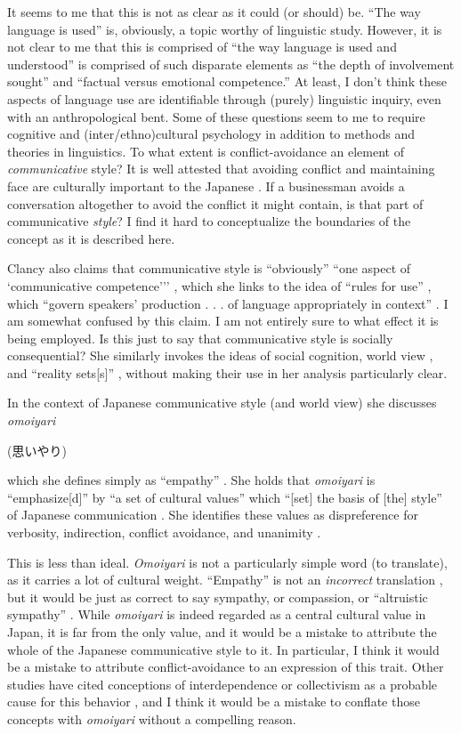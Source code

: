 \documentclass[man,12pt,natbib]{apa6}
\begin{document}
It seems to me that this is not as clear as it could (or should) be.  ``The way
language is used'' is, obviously, a topic worthy of linguistic study. However,
it is not clear to me that this is comprised of ``the way language is used and
understood'' is comprised of such disparate elements as ``the depth of
involvement sought'' and ``factual versus emotional competence.'' At least, I
don't think these aspects of language use are identifiable through (purely)
linguistic inquiry, even with an anthropological bent. Some of these questions
seem to me to require cognitive and (inter/ethno)cultural psychology in
addition to methods and theories in linguistics. To what extent is
conflict-avoidance an element of \emph{communicative} style? It is well
attested that avoiding conflict and maintaining face are culturally important
to the Japanese \citep{Benedict46,Ohbuchi94}. If a businessman avoids a
conversation altogether to avoid the conflict it might contain, is that part of
communicative \emph{style}? I find it hard to conceptualize the boundaries of
the concept as it is described here.

Clancy also claims that communicative style is ``obviously'' ``one aspect of
`communicative competence''\thinspace ' \citep[p.~213]{Clancy87}, which she
links to the idea of ``rules for use'' \citep{Hymes72}, which ``govern
speakers' production . . .  of language appropriately in context''
\citep[p.~213]{Clancy87}.  I am somewhat confused by this claim. I am not
entirely sure to what effect it is being employed. Is this just to say that
communicative style is socially consequential?  She similarly invokes the ideas
of social cognition, world view \citep{Whorf56}, and ``reality sets[s]''
\citep{Scollon81}, without making their use in her analysis particularly clear.

In the context of Japanese communicative style (and world view) she discusses
\emph{omoiyari} \begin{CJK}{UTF8}{min}(思いやり)\end{CJK} which she defines
simply as ``empathy'' \citep[p.~214]{Clancy87}. She holds that \emph{omoiyari}
is ``emphasize[d]'' by ``a set of cultural values'' which ``[set] the basis of
[the] style'' of Japanese communication \cite[pp.~213-214]{Clancy87}. She
identifies these values as dispreference for verbosity, indirection, conflict
avoidance, and unanimity \citep[p.~214-216]{Clancy87}.

This is less than ideal. \emph{Omoiyari} is not a particularly simple word (to
translate), as it carries a lot of cultural weight. ``Empathy'' is not an
\emph{incorrect} translation \citep{Travis98}, but it would be just as correct
to say sympathy, or compassion, or ``altruistic sympathy'' \citep{Hara06}.
While \emph{omoiyari} is indeed regarded as a central cultural value in Japan,
it is far from the only value, and it would be a mistake to attribute the whole
of the Japanese communicative style to it. In particular, I think it would be a
mistake to attribute conflict-avoidance to an expression of this trait. Other
studies have cited conceptions of interdependence or collectivism as a probable
cause for this behavior \citep{Ohbuchi94}, and I think it would be a mistake to
conflate those concepts with \emph{omoiyari} without a compelling reason.
\end{document}
